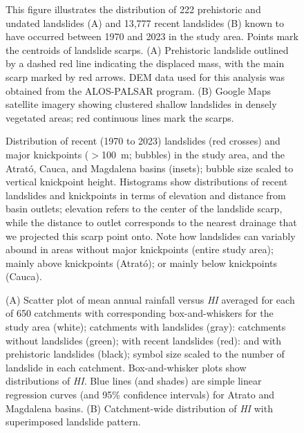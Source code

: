 \documentclass[draft]{agujournal2019}
\begin{document}
\begin{figure}[ht!]
  \begin{minipage}{.55\linewidth}
    \centering
  \end{minipage}\quad
  \begin{minipage}{.41\linewidth}
    \centering
  \end{minipage} 
    \caption{This figure illustrates the distribution of 222 prehistoric and undated landslides (A) and 13,777 recent landslides (B) known to have occurred between 1970 and 2023 in the study area. Points mark the centroids of landslide scarps. (A) Prehistoric landslide outlined by a dashed red line indicating the displaced mass, with the main scarp marked by red arrows. DEM data used for this analysis was obtained from the ALOS-PALSAR program. (B) Google Maps satellite imagery showing clustered shallow landslides in densely vegetated areas; red continuous lines mark the scarps.}
    \label{fig:inventory}
\end{figure}


\begin{figure}[ht!]
    \caption{Distribution of recent (1970 to 2023) landslides (red crosses) and major knickpoints ($>$100~m; bubbles) in the study area, and the Atrató, Cauca, and Magdalena basins (insets); bubble size scaled to vertical knickpoint height. Histograms show distributions of recent landslides and knickpoints in terms of elevation and distance from basin outlets; elevation refers to the center of the landslide scarp, while the distance to outlet corresponds to the nearest drainage that we projected this scarp point onto. Note how landslides can variably abound in areas without major knickpoints (entire study area); mainly above knickpoints (Atrató); or mainly below knickpoints (Cauca).}
  \label{fig:profiles}
\end{figure}

\begin{figure}[ht!]
  \begin{minipage}{.48\linewidth}
    \centering
  \end{minipage}\quad
  \begin{minipage}{.48\linewidth}
    \centering
  \end{minipage} 
    \caption{(A) Scatter plot of mean annual rainfall versus \textit{HI} averaged for each of 650 catchments with corresponding box-and-whiskers for the study area (white); catchments with landslides (gray): catchments without landslides (green); with recent landslides (red): and with prehistoric landslides (black); symbol size scaled to the number of landslide in each catchment. Box-and-whisker plots show distributions of \textit{HI}. Blue lines (and shades) are simple linear regression curves (and 95\% confidence intervals) for Atrato and Magdalena basins. (B) Catchment-wide distribution of \textit{HI} with superimposed landslide pattern.}
    \label{fig:hypso}
\end{figure}
\end{document}
